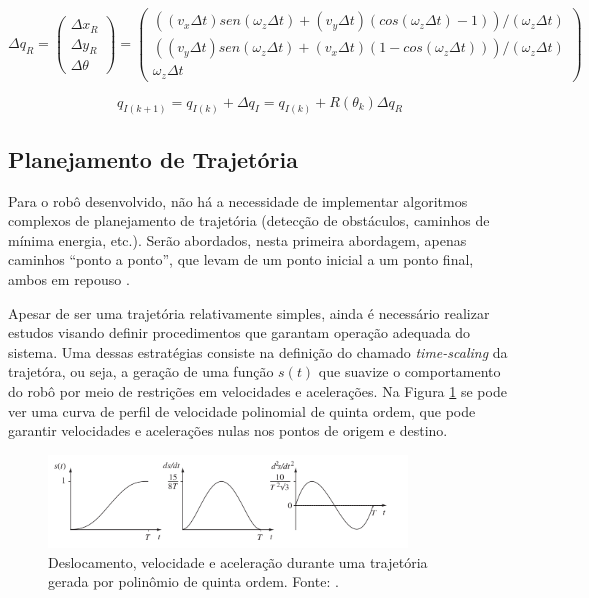 \begin{equation}
  \Delta q_R
  =
  \begin{pmatrix}
    \Delta x_R \\
    \Delta y_R \\
    \Delta\theta
  \end{pmatrix}
  =
  \begin{pmatrix}
    ((v_x  \Delta t)  sen(\omega_z  \Delta t ) + (v_y  \Delta t)  (cos(\omega_z  \Delta t  ) - 1))/(\omega_z   \Delta t  ) \\
    ((v_y  \Delta t)  sen(\omega_z  \Delta t ) + (v_x  \Delta t) (1-cos(\omega_z   \Delta t  )))/ (\omega_z  \Delta t  ) \\
    \omega_z   \Delta t
  \end{pmatrix}
  \label{eq:desvio}
\end{equation}


\begin{equation}
  q_{I(k+1)} = q_{I(k)} + \Delta q_I = q_{I(k)} + R(\theta_k) \Delta q_R
  \label{eq:new_odo}
\end{equation}

\subsection{Planejamento de Trajetória}

Para o robô desenvolvido, não há a necessidade de implementar algoritmos complexos de planejamento de trajetória (detecção de obstáculos, caminhos de mínima energia, etc.). Serão abordados, nesta primeira abordagem, apenas caminhos ``ponto a ponto'', que levam de um ponto inicial a um ponto final, ambos em repouso \citep{lynch2017modern}.

Apesar de ser uma trajetória relativamente simples, ainda é necessário realizar estudos visando definir procedimentos que garantam operação adequada do sistema. Uma dessas estratégias consiste na definição do chamado \textit{time-scaling} da trajetóra, ou seja, a geração de uma função $s(t)$ que suavize o comportamento do robô por meio de restrições em velocidades e acelerações. Na Figura \ref{fig:poly5} se pode ver uma curva de perfil de velocidade polinomial de quinta ordem, que pode garantir velocidades e acelerações nulas nos pontos de origem e destino.

\begin{figure}[h]
  \centering
  \includegraphics[width = 0.85\textwidth]{imagens/poly5}
  \caption{Deslocamento, velocidade e aceleração durante uma trajetória gerada por polinômio de quinta ordem. Fonte: \citet{lynch2017modern}.}
  \label{fig:poly5}
\end{figure}

